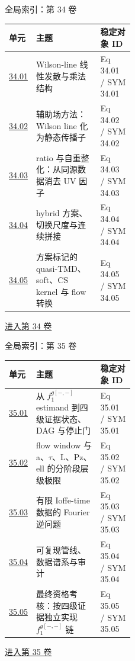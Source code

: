 \documentclass[aspectratio=169,10pt]{ctexbeamer}
\begin{document}
\begin{frame}[t]{全局索引：第 34 卷}
\small\begin{tabularx}{\linewidth}{p{0.15\linewidth}Yp{0.27\linewidth}}
\toprule 单元 & 主题 & 稳定对象 ID\\\midrule
\hyperlink{Fr:34.01-1}{34.01} & Wilson-line 线性发散与乘法结构 & Eq 34.01 / SYM 34.01\\
\hyperlink{Fr:34.02-1}{34.02} & 辅助场方法：Wilson line 化为静态传播子 & Eq 34.02 / SYM 34.02\\
\hyperlink{Fr:34.03-1}{34.03} & ratio 与自重整化：从同源数据消去 UV 因子 & Eq 34.03 / SYM 34.03\\
\hyperlink{Fr:34.04-1}{34.04} & hybrid 方案、切换尺度与连续拼接 & Eq 34.04 / SYM 34.04\\
\hyperlink{Fr:34.05-1}{34.05} & 方案标记的 quasi-TMD、soft、CS kernel 与 flow 转换 & Eq 34.05 / SYM 34.05\\
\bottomrule\end{tabularx}
\vfill\hyperlink{Fr:V34-title}{进入第 34 卷}
\end{frame}

\begin{frame}[t]{全局索引：第 35 卷}
\small\begin{tabularx}{\linewidth}{p{0.15\linewidth}Yp{0.27\linewidth}}
\toprule 单元 & 主题 & 稳定对象 ID\\\midrule
\hyperlink{Fr:35.01-1}{35.01} & 从 \ensuremath{f_1^{g[-,-]}} estimand 到四级证据状态、DAG 与停止门 & Eq 35.01 / SYM 35.01\\
\hyperlink{Fr:35.02-1}{35.02} & flow window 与 a、\ensuremath{\tau}、L、Pz、ell 的分阶段层级极限 & Eq 35.02 / SYM 35.02\\
\hyperlink{Fr:35.03-1}{35.03} & 有限 Ioffe-time 数据的 Fourier 逆问题 & Eq 35.03 / SYM 35.03\\
\hyperlink{Fr:35.04-1}{35.04} & 可复现管线、数据谱系与审计 & Eq 35.04 / SYM 35.04\\
\hyperlink{Fr:35.05-1}{35.05} & 最终资格考核：按四级证据独立实现 \ensuremath{f_1^{g[-,-]}} 链 & Eq 35.05 / SYM 35.05\\
\bottomrule\end{tabularx}
\vfill\hyperlink{Fr:V35-title}{进入第 35 卷}
\end{frame}




































\end{document}
